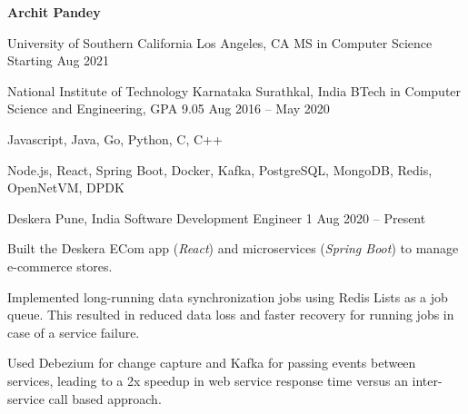 \documentclass[10pt,a4paper]{article}
\begin{document}
\begin{center}
	\textbf{\LARGE Archit Pandey}\\[1ex]
\end{center}



\headedsectionfive
{University of Southern California}
{Los Angeles, CA}
{MS in Computer Science}
{Starting Aug 2021}

\headedsectionfive
{National Institute of Technology Karnataka}
{Surathkal, India}
{BTech in Computer Science and Engineering, GPA 9.05}
{Aug 2016 -- May 2020}

\begin{circlist}
	\item Javascript, Java, Go, Python, C, C++
	\item Node.js, React, Spring Boot, Docker, Kafka, PostgreSQL, MongoDB, Redis, OpenNetVM, DPDK
\end{circlist}

\headedsection
{Deskera}
{Pune, India}
{Software Development Engineer 1}
{Aug 2020 -- Present}{
	\begin{circlist}
		\item Built the Deskera ECom app (\textit{React}) and microservices (\textit{Spring Boot}) to manage e-commerce stores.
		\item Implemented long-running data synchronization jobs using Redis Lists as a job queue. This resulted in reduced data loss and faster recovery for running jobs in case of a service failure.
		\item Used Debezium for change capture and Kafka for passing events between services, leading to a 2x speedup in web service response time versus an inter-service call based approach.
	\end{circlist}
}
\end{document}
